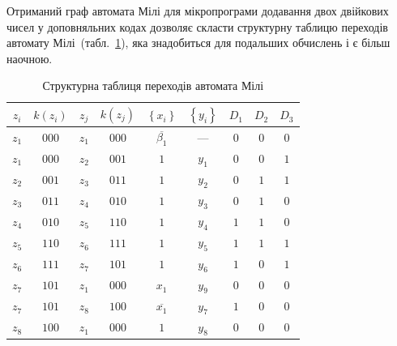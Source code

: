\documentclass[
	a4paper,
	oneside,
	DIV = 12,
	12pt,
	headings = normal,
]{scrartcl}
\newcommand{\barneg}[1]{\overline{#1}}
\begin{document}
			Отриманий граф автомата Мілі для мікропрограми додавання двох двійкових чисел у доповняльних кодах дозволяє скласти структурну таблицю переходів автомату Мілі~(табл.~\ref{tab:structured-transfer-table}), яка знадобиться для подальших обчислень і є більш наочною.
			\begin{table}[!htbp]
				\centering
				\caption{Структурна таблиця переходів автомата Мілі}
				\label{tab:structured-transfer-table}
				\begin{tabular}{*{9}{c}}
					\toprule
						$z_i$ & $k(z_i)$ & $z_j$ & $k(z_j)$ & $\left\{ x_i \right\}$ & $\left\{ y_i \right\}$ & $D_1$ & $D_2$ & $D_3$\\
					\midrule
						$z_1$ & $000$ & $z_1$ & $000$ & $\barneg{\beta_1}$ & $—$   & $0$ & $0$ & $0$\\
						$z_1$ & $000$ & $z_2$ & $001$ & $1$                & $y_1$ & $0$ & $0$ & $1$\\
						$z_2$ & $001$ & $z_3$ & $011$ & $1$                & $y_2$ & $0$ & $1$ & $1$\\
						$z_3$ & $011$ & $z_4$ & $010$ & $1$                & $y_3$ & $0$ & $1$ & $0$\\
						$z_4$ & $010$ & $z_5$ & $110$ & $1$                & $y_4$ & $1$ & $1$ & $0$\\
						$z_5$ & $110$ & $z_6$ & $111$ & $1$                & $y_5$ & $1$ & $1$ & $1$\\
						$z_6$ & $111$ & $z_7$ & $101$ & $1$                & $y_6$ & $1$ & $0$ & $1$\\
						$z_7$ & $101$ & $z_1$ & $000$ & $x_1$              & $y_9$ & $0$ & $0$ & $0$\\
						$z_7$ & $101$ & $z_8$ & $100$ & $\barneg{x_1}$     & $y_7$ & $1$ & $0$ & $0$\\
						$z_8$ & $100$ & $z_1$ & $000$ & $1$                & $y_8$ & $0$ & $0$ & $0$\\
						\bottomrule
				\end{tabular}
			\end{table}
\end{document}
